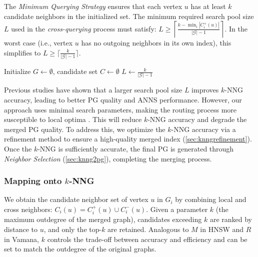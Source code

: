 \documentclass[acmsmall]{acmart}
\theoremstyle{remark}
\theoremstyle{definition}
\begin{document}
The \textit{Minimum Querying Strategy} ensures that each vertex $u$ has at least $k$ candidate neighbors in the initialized set. The minimum required search pool size $L$ used in the \textit{cross-querying} process must satisfy: $L \geq \left\lceil \frac{k - \min_i |C_{i}^{+}(u)|}{|\mathcal{G}| - 1} \right\rceil$. In the worst case (i.e., vertex $u$ has no outgoing neighbors in its own index), this simplifies to $L \geq \lceil \frac{k}{|\mathcal{G}| - 1} \rceil$.

\begin{algorithm}[t]\small
	\DontPrintSemicolon
	
	Initialize $G \gets \emptyset$, candidate set $C \gets \emptyset$\;
	$L \gets \tfrac{k}{|\mathcal{G}| - 1}$\;
	\;
	\caption{PGs to $k$-NNG Transformation}
	\label{algo:pg2knng}
\end{algorithm}

Previous studies \cite{yang2024revisiting} have shown that a larger search pool size $L$ improves $k$-NNG accuracy, leading to better PG quality and ANNS performance. However, our approach uses minimal search parameters, making the routing process more susceptible to local optima \cite{prokhorenkova2020graph}. This will reduce $k$-NNG accuracy and degrade the merged PG quality. To address this, we optimize the $k$-NNG accuracy via a refinement method to ensure a high-quality merged index (\textsection\ref{sec:knngrefinement}). Once the $k$-NNG is sufficiently accurate, the final PG is generated through \textit{Neighbor Selection} (\textsection\ref{sec:knng2pg}), completing the merging process.

\subsubsection{Mapping onto $k$-NNG}\label{subsubsec:mapping} We obtain the candidate neighbor set of vertex $u$ in $G_i$ by combining local and cross neighbors: $C_i(u) = C_i^{+}(u) \cup C_i^{-}(u)$. Given a parameter $k$ (the maximum outdegree of the merged graph), candidates exceeding $k$ are ranked by distance to $u$, and only the top-$k$ are retained. Analogous to $M$ in HNSW and $R$ in Vamana, $k$ controls the trade-off between accuracy and efficiency and can be set to match the outdegree of the original graphs.
\end{document}
